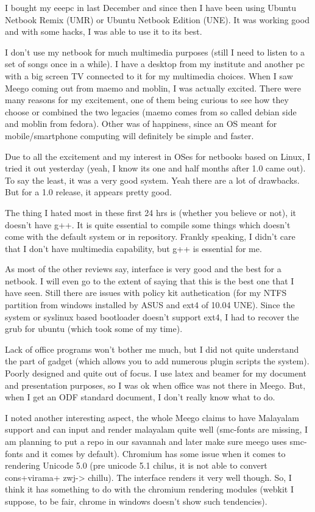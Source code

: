 \vskip 2pt

I bought my eeepc in last December and since then I have been using Ubuntu Netbook Remix (UMR) or Ubuntu Netbook Edition (UNE). 
It was working good and with some hacks, I was able to use it to its best.

I don't use my netbook for much multimedia purposes (still I need to listen to a set of songs once in a while). 
I have a desktop from my institute and another pc with a big screen TV connected to it for my multimedia choices. 
When I saw Meego coming out from maemo and moblin, I was actually excited. There were many reasons for my excitement, 
one of them being curious to see how they choose or combined the two legacies (maemo comes from so called debian side and moblin from fedora).
Other was of happiness, since an OS meant for mobile/smartphone computing will definitely be simple and faster.

Due to all the excitement and my interest in OSes for netbooks based on Linux, I tried it out yesterday (yeah, I know its one and half months after 1.0 came out). To say the least, it was a very good system. 
Yeah there are a lot of drawbacks. But for a 1.0 release, it appears pretty good.

The thing I hated most in these first 24 hrs is (whether you believe or not), it doesn’t have g++. 
It is quite essential to compile some things which doesn’t come with the default system or in repository. 
Frankly speaking, I didn’t care that I don’t have multimedia capability, but g++ is essential for me.

As most of the other reviews say, interface is very good and the best for a netbook. I will even go to the extent of saying that this is the best one that I have seen. Still there are issues with policy kit authetication (for my NTFS partition from windows 
installed by ASUS and ext4 of 10.04 UNE). Since the system or syslinux based bootloader doesn’t support ext4, 
I had to recover the grub for ubuntu (which took some of my time).

Lack of office programs won't bother me much, but I did not quite understand the part of gadget (which allows you to add numerous 
plugin scripts the system). Poorly designed and quite out of focus. I use latex and beamer for my document and presentation 
purposes, so I was ok when office was not there in Meego. But, when I get an ODF standard document, 
I don’t really know what to do.

I noted another interesting aspect, the whole Meego claims to have Malayalam support and can input and render 
malayalam quite well (smc-fonts are missing, I am planning to put a repo in our savannah and later make sure 
meego uses smc-fonts and it comes by default). Chromium has some issue when it comes to rendering Unicode 
5.0 (pre unicode 5.1 chilus, it is not able to convert cons+virama+ zwj-> chillu). 
The interface renders it very well though. So, I think it has something to do with the chromium 
rendering modules (webkit I suppose, to be fair, chrome in windows doesn’t show such tendencies).

